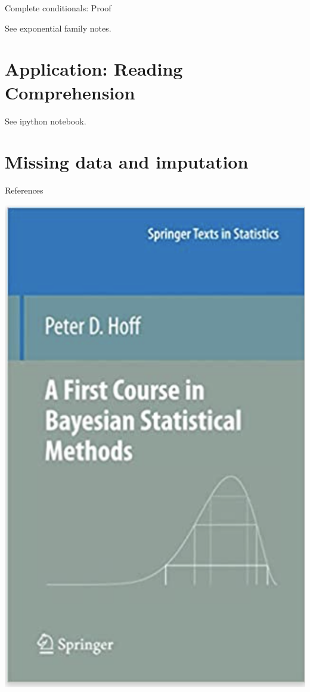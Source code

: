 \documentclass[10pt]{beamer}
\begin{document}
\begin{frame}{Complete conditionals: Proof}

See exponential family notes. 

\end{frame}
	
	

\section{Application: Reading Comprehension}

\begin{frame}

See ipython notebook. 	
\end{frame}


\section{Missing data and imputation}

\begin{frame}{References}

\begin{center}
\includegraphics[width=.5\textwidth]{images/hoff_book}
\end{center}

\end{frame}
\end{document}
